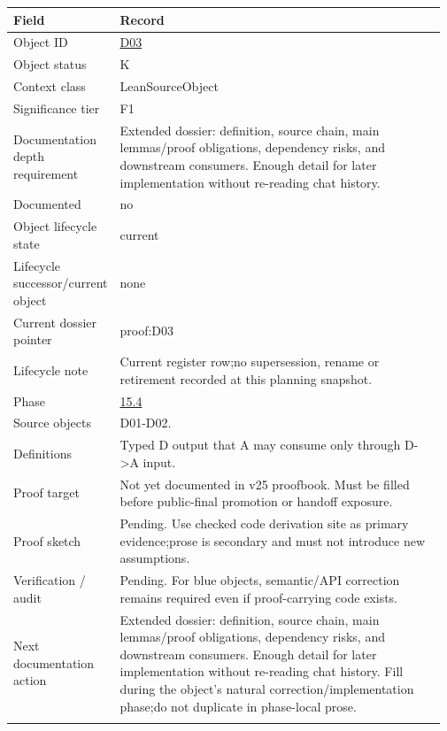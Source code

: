 \begin{longtable}{L{0.16\linewidth} L{0.81\linewidth}}
\hline
\textbf{Field} & \textbf{Record}\\
\hline
Object ID & \hyperlink{object-row-D03}{D03}\\
\hline\addlinespace[0.20em]
Object status & K\\
\hline\addlinespace[0.20em]
Context class & LeanSourceObject\\
\hline\addlinespace[0.20em]
Significance tier & F1\\
\hline\addlinespace[0.20em]
Documentation depth requirement & Extended dossier: definition, source chain, main lemmas/\allowbreak{}proof obligations, dependency risks, and downstream consumers. Enough detail for later implementation without re-reading chat history.\\
\hline\addlinespace[0.20em]
Documented & no\\
\hline\addlinespace[0.20em]
Object lifecycle state & current\\
\hline\addlinespace[0.20em]
Lifecycle successor/\allowbreak{}current object & none\\
\hline\addlinespace[0.20em]
Current dossier pointer & proof:D03\\
\hline\addlinespace[0.20em]
Lifecycle note & Current register row;\newline no supersession, rename or retirement recorded at this planning snapshot.\\
\hline\addlinespace[0.20em]
Phase & \hyperlink{phase-row-15-4}{15.4}\\
\hline\addlinespace[0.20em]
Source objects & D01-D02.\\
\hline\addlinespace[0.20em]
Definitions & Typed D output that A may consume only through D->A input.\\
\hline\addlinespace[0.20em]
Proof target & Not yet documented in v25 proofbook. Must be filled before public-final promotion or handoff exposure.\\
\hline\addlinespace[0.20em]
Proof sketch & Pending. Use checked code derivation site as primary evidence;\newline prose is secondary and must not introduce new assumptions.\\
\hline\addlinespace[0.20em]
Verification /\allowbreak{} audit & Pending. For blue objects, semantic/\allowbreak{}API correction remains required even if proof-carrying code exists.\\
\hline\addlinespace[0.20em]
Next documentation action & Extended dossier: definition, source chain, main lemmas/\allowbreak{}proof obligations, dependency risks, and downstream consumers. Enough detail for later implementation without re-reading chat history. Fill during the object's natural correction/\allowbreak{}implementation phase;\newline do not duplicate in phase-local prose.\\
\hline\addlinespace[0.20em]
\end{longtable}
